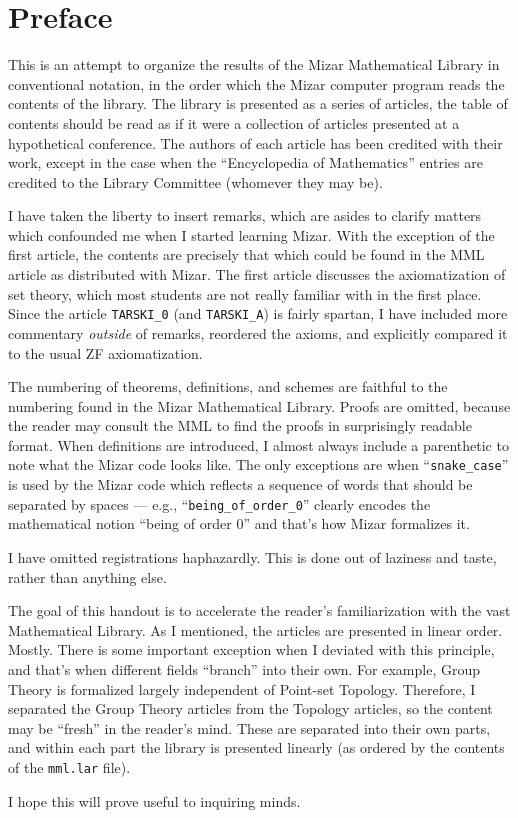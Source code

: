\chapter*{Preface}

This is an attempt to organize the results of the Mizar Mathematical
Library in conventional notation, in the order which the Mizar computer
program reads the contents of the library. The library is presented as a
series of articles, the table of contents should be read as if it were a
collection of articles presented at a hypothetical conference. The
authors of each article has been credited with their work, except in the
case when the ``Encyclopedia of Mathematics'' entries are credited to
the Library Committee (whomever they may be).

I have taken the liberty to insert remarks, which are asides to clarify
matters which confounded me when I started learning Mizar. With the
exception of the first article, the contents are precisely that which
could be found in the MML article as distributed with Mizar. The first
article discusses the axiomatization of set theory, which most students
are not really familiar with in the first place. Since the article
\verb#TARSKI_0# (and \verb#TARSKI_A#) is fairly spartan, I have included more
commentary \emph{outside} of remarks, reordered the axioms, and
explicitly compared it to the usual \textsf{ZF} axiomatization.

The numbering of theorems, definitions, and schemes are faithful to the
numbering found in the Mizar Mathematical Library. Proofs are omitted,
because the reader may consult the MML to find the proofs in
surprisingly readable format. When definitions are introduced, I almost
always include a parenthetic to note what the Mizar code looks like. The
only exceptions are when ``\verb#snake_case#'' is used by the Mizar code
which reflects a sequence of words that should be separated by spaces
--- e.g., ``\verb#being_of_order_0#'' clearly encodes the mathematical
notion ``being of order $0$'' and that's how Mizar formalizes it.

I have omitted registrations haphazardly. This is done out of laziness
and taste, rather than anything else.

The goal of this handout is to accelerate the reader's familiarization
with the vast Mathematical Library. As I mentioned, the articles are
presented in linear order. Mostly. There is some important exception
when I deviated with this principle, and that's when different fields
``branch'' into their own. For example, Group Theory is formalized
largely independent of Point-set Topology. Therefore, I separated the
Group Theory articles from the Topology articles, so the content may be
``fresh'' in the reader's mind. These are separated into their own
parts, and within each part the library is presented linearly (as
ordered by the contents of the \verb#mml.lar# file).

I hope this will prove useful to inquiring minds.

